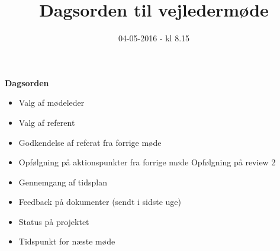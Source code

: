 \documentclass{article}
\title{Dagsorden til vejledermøde}
\date{04-05-2016 - kl 8.15}
\begin{document}
	\maketitle
	\textbf{Dagsorden}
	
	\begin{itemize}
		\item Valg af mødeleder
		\item Valg af referent
		\item Godkendelse af referat fra forrige møde 
		\item Opfølgning på aktionspunkter fra forrige møde
			\subitem Opfølgning på review 2
		\item Gennemgang af tidsplan
		\item Feedback på dokumenter (sendt i sidste uge)
		\item Status på projektet
		\item Tidspunkt for næste møde
	\end{itemize}
\end{document}
